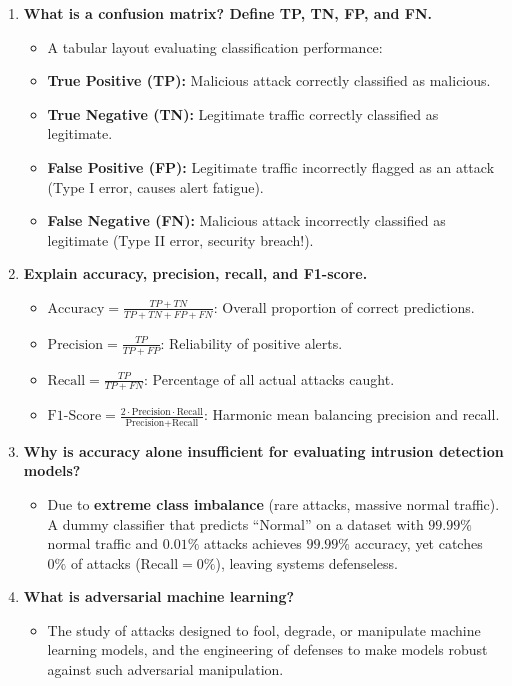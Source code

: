 \begin{enumerate}[label=\textbf{Q\arabic*.,resume},leftmargin=1.2cm]
\item \textbf{What is a confusion matrix? Define TP, TN, FP, and FN.}
\begin{itemize}
\item A tabular layout evaluating classification performance:
\item \textbf{True Positive (TP):} Malicious attack correctly classified as malicious.
\item \textbf{True Negative (TN):} Legitimate traffic correctly classified as legitimate.
\item \textbf{False Positive (FP):} Legitimate traffic incorrectly flagged as an attack (Type I error, causes alert fatigue).
\item \textbf{False Negative (FN):} Malicious attack incorrectly classified as legitimate (Type II error, security breach!).
\end{itemize}

\item \textbf{Explain accuracy, precision, recall, and F1-score.}
\begin{itemize}
\item $\text{Accuracy} = \frac{TP + TN}{TP + TN + FP + FN}$: Overall proportion of correct predictions.
\item $\text{Precision} = \frac{TP}{TP + FP}$: Reliability of positive alerts.
\item $\text{Recall} = \frac{TP}{TP + FN}$: Percentage of all actual attacks caught.
\item $\text{F1-Score} = \frac{2 \cdot \text{Precision} \cdot \text{Recall}}{\text{Precision} + \text{Recall}}$: Harmonic mean balancing precision and recall.
\end{itemize}

\item \textbf{Why is accuracy alone insufficient for evaluating intrusion detection models?}
\begin{itemize}
\item Due to \textbf{extreme class imbalance} (rare attacks, massive normal traffic). A dummy classifier that predicts ``Normal'' on a dataset with $99.99\%$ normal traffic and $0.01\%$ attacks achieves $99.99\%$ accuracy, yet catches $0\%$ of attacks ($\text{Recall} = 0\%$), leaving systems defenseless.
\end{itemize}

\item \textbf{What is adversarial machine learning?}
\begin{itemize}
\item The study of attacks designed to fool, degrade, or manipulate machine learning models, and the engineering of defenses to make models robust against such adversarial manipulation.
\end{itemize}


\end{enumerate}
